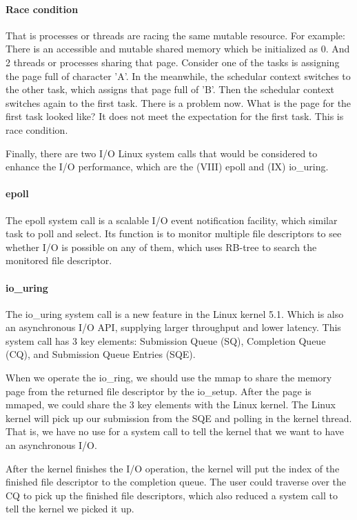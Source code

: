 \documentclass[12pt,a4paper]{article}
\begin{document}
\paragraph{Race condition}
That is processes or threads are racing the same mutable resource. For example:
There is an accessible and mutable shared memory which be initialized as 0. And
2 threads or processes sharing that page. Consider one of the tasks is assigning
the page full of character 'A'. In the meanwhile, the schedular context switches to
the other task, which assigns that page full of 'B'. Then the schedular context switches
again to the first task. There is a problem now. What is the page for the first
task looked like? It does not meet the expectation for the first task.
This is race condition.

Finally, there are two I/O Linux system calls that would be considered to enhance
the I/O performance, which are the (\RN{8}) epoll and (\RN{9}) io\_uring.

\paragraph{epoll}
The epoll system call is a scalable I/O event notification facility, which similar
task to poll and select. Its function is to monitor multiple file descriptors to
see whether I/O is possible on any of them, which uses RB-tree to search the monitored
file descriptor.

\paragraph{io\_uring}
The io\_uring system call is a new feature in the Linux kernel 5.1. Which is also an
asynchronous I/O API, supplying larger throughput and lower latency. This system call
has 3 key elements: Submission Queue (SQ), Completion Queue (CQ), and Submission Queue
Entries (SQE).

When we operate the io\_ring, we should use the mmap to share the memory page from
the returned file descriptor by the io\_setup. After the page is mmaped, we could share
the 3 key elements with the Linux kernel. The Linux kernel will pick up our submission
from the SQE and polling in the kernel thread. That is, we have no use for a system call
to tell the kernel that we want to have an asynchronous I/O.

After the kernel finishes the I/O operation, the kernel will put the index of the finished
file descriptor to the completion queue. The user could traverse over the CQ to pick up
the finished file descriptors, which also reduced a system call to tell the kernel we picked
it up.
\end{document}
